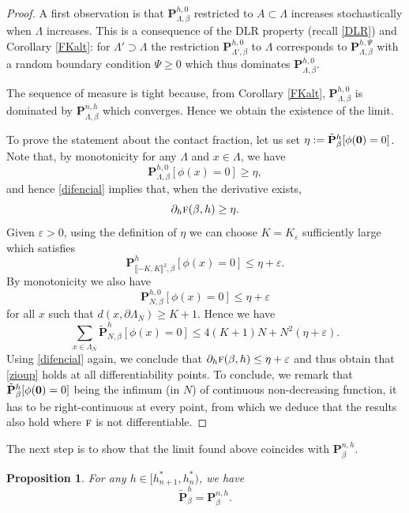\documentclass[10pt]{amsart}
\numberwithin{equation}{section}
\theoremstyle{plain}
\newtheorem{proposition}[theorem]{Proposition}
\theoremstyle{definition}
\newcommand{\lint}{\llbracket}
\newcommand{\rint}{\rrbracket}
\newcommand{\bP}{{\ensuremath{\mathbf P}} }
\newcommand{\gb}{\beta}
\newcommand{\gep}{\varepsilon}
\newcommand{\gL}{\Lambda}
\newcommand{\tf}{\textsc{f}}
\begin{document}
\begin{proof}
A first observation is that $\bP^{h,0}_{\gL,\gb}$ restricted to $A\subset \gL$ increases stochastically when $\gL$ increases.
This is a consequence of the DLR property (recall \eqref{DLR}) and Corollary \ref{FKalt}: for $\gL'\supset \gL$ the restriction
$\bP^{h,0}_{\gL',\gb}$ to $\gL$ corresponds to $\bP^{h,\Psi}_{\gL,\gb}$ with a random boundary condition $\Psi\ge 0$ which thus dominates $\bP^{h,0}_{\gL,\gb}$.

The sequence of measure is tight because, from Corollary \ref{FKalt}, $\bP^{h,0}_{\gL,\gb}$ is dominated by $\bP^{n,h}_{\gL,\gb}$ which converges.
Hence we obtain the existence of the limit.

To prove the statement about the contact fraction, let us set $\eta:= \tilde \bP^{h}_{\gb}[\phi({\bf 0})=0]$.
Note that, by monotonicity for any $\gL$ and $x\in \gL$, we have
\begin{equation*}
\bP^{h,0}_{\gL,\gb}[\phi(x)=0] \ge \eta,
\end{equation*}
and hence \eqref{difencial} implies that, when the derivative exists,
\begin{equation*}
\partial_h\tf(\gb,h)\ge \eta.
\end{equation*}
Given $\gep>0$, using the definition of $\eta$ we can choose $K=K_\gep$ sufficiently large which satisfies
\[
\bP^{h}_{\lint -K,K\rint^2,\gb}[\phi(x)=0]\le \eta+\gep.
\]
By monotonicity we also have
\[
\bP^{h,0}_{N,\gb}[\phi(x)=0]\le \eta+\gep
\]
for all $x$ such that $d(x,\partial \gL_N)\ge K+1$.
Hence we have
\begin{equation*}
\sum_{x\in \gL_N} \tilde \bP^{h}_{N,\gb}[\phi(x)=0]\le 4 (K+1) N+ N^2(\eta+\gep).
\end{equation*}
Using \eqref{difencial} again, we conclude that $\partial_h\tf(\gb,h)\le \eta+\gep$ and thus obtain that \eqref{zioup} holds at all differentiability points.
To conclude, we remark that $\tilde \bP^{h}_{\gb}[\phi({\bf 0})=0]$ being the infimum (in $N$) of continuous non-decreasing function, it has to be right-continuous 
at every point, from which we deduce that the results also hold where $\tf$ is not differentiable.
\end{proof}

The next step is to show that the limit found above coincides with $\bP^{n,h}_{\gb}$.

\begin{proposition}\label{dabot}
For any $h\in [h^*_{n+1},h^*_n)$, we have
\begin{equation}
\tilde \bP^{h}_{\gb}= \bP^{n,h}_{\gb}.
\end{equation}
\end{proposition}
\end{document}
